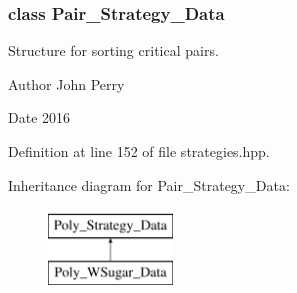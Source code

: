 \subsubsection{class Pair\+\_\+\+Strategy\+\_\+\+Data}
Structure for sorting critical pairs. 

\begin{DoxyAuthor}{Author}
John Perry 
\end{DoxyAuthor}
\begin{DoxyDate}{Date}
2016 
\end{DoxyDate}


Definition at line 152 of file strategies.\+hpp.

Inheritance diagram for Pair\+\_\+\+Strategy\+\_\+\+Data\+:\begin{figure}[H]
\begin{center}
\leavevmode
\includegraphics[height=2.000000cm]{group__strategygroup}
\end{center}
\end{figure}
